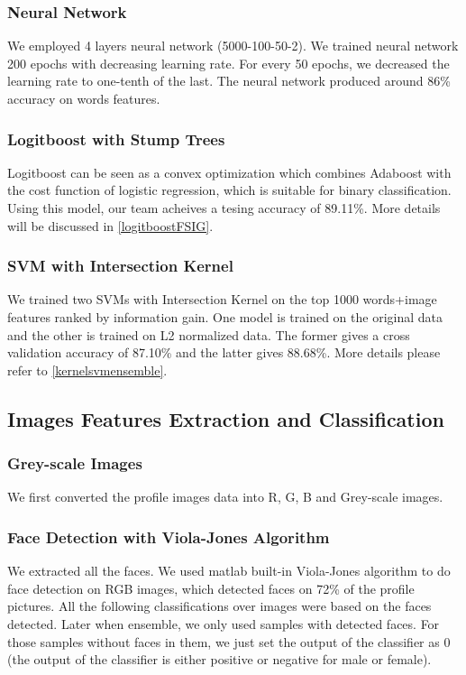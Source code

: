 \subsubsection{Neural Network}
We employed 4 layers neural network (5000-100-50-2). We trained neural network 200 epochs with decreasing learning rate. For every 50 epochs, we decreased the learning rate to one-tenth of the last. The neural network produced around 86\% accuracy on words features.
\subsubsection{Logitboost with Stump Trees}
Logitboost can be seen as a convex optimization which combines Adaboost with the cost function of logistic regression, which is suitable for binary classification. Using this model, our team acheives a tesing accuracy of 89.11\%. More details will be discussed in \ref{logitboostFSIG}.
\subsubsection{SVM with Intersection Kernel}
We trained two SVMs with Intersection Kernel on the top 1000 words+image features ranked by information gain. One model is trained on the original data and the other is trained on L2 normalized data. The former gives a cross validation accuracy of 87.10\% and the latter gives 88.68\%. More details please refer to \ref{kernelsvmensemble}.\\
\subsection{Images Features Extraction and Classification}
\subsubsection{Grey-scale Images}
We first converted the profile images data into R, G, B and Grey-scale images. 
\subsubsection{Face Detection with Viola-Jones Algorithm}
We extracted all the faces. We used matlab built-in Viola-Jones algorithm to do face detection on RGB images, which detected faces on 72\% of the profile pictures. All the following classifications over images were based on the faces detected. Later when ensemble, we only used samples with detected faces. For those samples without faces in them, we just set the output of the classifier as 0 (the output of the classifier is either positive or negative for male or female).
